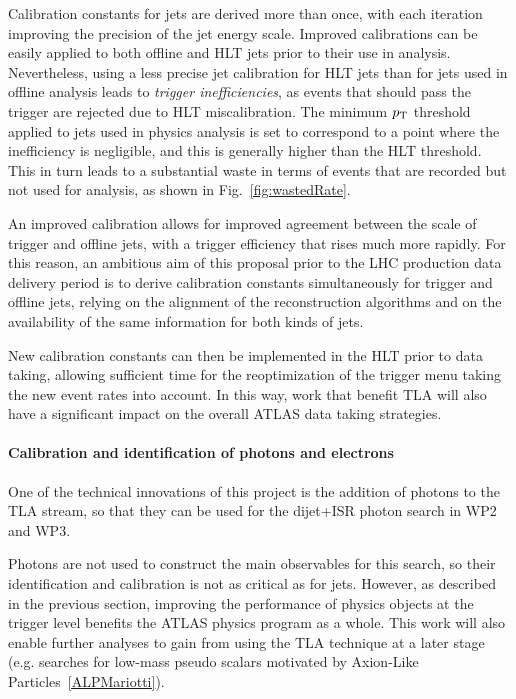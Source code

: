 Calibration constants for jets are derived more than once, with each iteration improving the precision of the jet energy scale. Improved calibrations can be easily applied to both offline and HLT jets prior to their use in analysis. 
Nevertheless, using a less precise jet calibration for HLT jets than for jets used in offline analysis leads to \textit{trigger inefficiencies}, as events that should pass the trigger are rejected due to HLT miscalibration. 
The minimum $p_{\rm{T}}$ threshold applied to jets used in physics analysis is set to correspond to a point where the inefficiency is negligible, and this is generally higher than the HLT threshold. 
This in turn leads to a substantial waste in terms of events that are recorded but not used for analysis, as shown in Fig.~\ref{fig:wastedRate}. 

An improved calibration allows for improved agreement between the scale of trigger and offline jets, with a trigger efficiency that rises much more rapidly. 
For this reason, an ambitious aim of this proposal prior to the LHC production data delivery period is to derive calibration constants simultaneously for trigger and offline jets, relying on the alignment of the reconstruction algorithms and on the availability of the same information for both kinds of jets. 

New calibration constants can then be implemented in the HLT prior to data taking, allowing sufficient time for the reoptimization of the trigger menu taking the new event rates into account. In this way, work that benefit TLA will also have a significant impact on the overall ATLAS data taking strategies. 

\paragraph{Calibration and identification of photons and electrons}
One of the technical innovations of this project is the addition of photons to the TLA stream, so that they can be used for the dijet+ISR photon search in WP2 and WP3.

Photons are not used to construct the main observables for this search, so their identification and calibration is not as critical as for jets. However, as described in the previous section, improving the performance of physics objects at the trigger level benefits the ATLAS physics program as a whole. This work will also enable further analyses to gain from using the TLA technique at a later stage (e.g. searches for low-mass pseudo scalars motivated by Axion-Like Particles~\ref{ALPMariotti}). 

